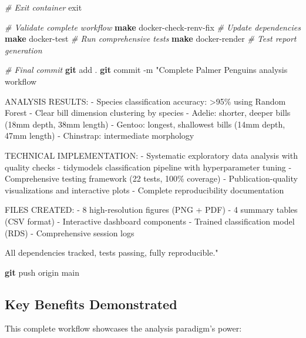 \documentclass[
]{article}
\newenvironment{Shaded}{\begin{snugshade}}{\end{snugshade}}
\newcommand{\AttributeTok}[1]{\textcolor[rgb]{0.13,0.29,0.53}{#1}}
\newcommand{\BuiltInTok}[1]{#1}
\newcommand{\CommentTok}[1]{\textcolor[rgb]{0.56,0.35,0.01}{\textit{#1}}}
\newcommand{\FunctionTok}[1]{\textcolor[rgb]{0.13,0.29,0.53}{\textbf{#1}}}
\newcommand{\NormalTok}[1]{#1}
\newcommand{\StringTok}[1]{\textcolor[rgb]{0.31,0.60,0.02}{#1}}
\begin{document}
\begin{Shaded}
\begin{Highlighting}[]
\CommentTok{\# Exit container}
\BuiltInTok{exit}

\CommentTok{\# Validate complete workflow}
\FunctionTok{make}\NormalTok{ docker{-}check{-}renv{-}fix    }\CommentTok{\# Update dependencies}
\FunctionTok{make}\NormalTok{ docker{-}test             }\CommentTok{\# Run comprehensive tests}
\FunctionTok{make}\NormalTok{ docker{-}render           }\CommentTok{\# Test report generation}

\CommentTok{\# Final commit}
\FunctionTok{git}\NormalTok{ add .}
\FunctionTok{git}\NormalTok{ commit }\AttributeTok{{-}m} \StringTok{"Complete Palmer Penguins analysis workflow}

\StringTok{ANALYSIS RESULTS:}
\StringTok{{-} Species classification accuracy: \textgreater{}95\% using Random Forest}
\StringTok{{-} Clear bill dimension clustering by species}
\StringTok{{-} Adelie: shorter, deeper bills (18mm depth, 38mm length)}
\StringTok{{-} Gentoo: longest, shallowest bills (14mm depth, 47mm length)}
\StringTok{{-} Chinstrap: intermediate morphology}

\StringTok{TECHNICAL IMPLEMENTATION:}
\StringTok{{-} Systematic exploratory data analysis with quality checks}
\StringTok{{-} tidymodels classification pipeline with hyperparameter tuning}
\StringTok{{-} Comprehensive testing framework (22 tests, 100\% coverage)}
\StringTok{{-} Publication{-}quality visualizations and interactive plots}
\StringTok{{-} Complete reproducibility documentation}

\StringTok{FILES CREATED:}
\StringTok{{-} 8 high{-}resolution figures (PNG + PDF)}
\StringTok{{-} 4 summary tables (CSV format)}
\StringTok{{-} Interactive dashboard components}
\StringTok{{-} Trained classification model (RDS)}
\StringTok{{-} Comprehensive session logs}

\StringTok{All dependencies tracked, tests passing, fully reproducible."}

\FunctionTok{git}\NormalTok{ push origin main}
\end{Highlighting}
\end{Shaded}

\subsection{Key Benefits Demonstrated}\label{key-benefits-demonstrated}

This complete workflow showcases the analysis paradigm's power:
\end{document}
